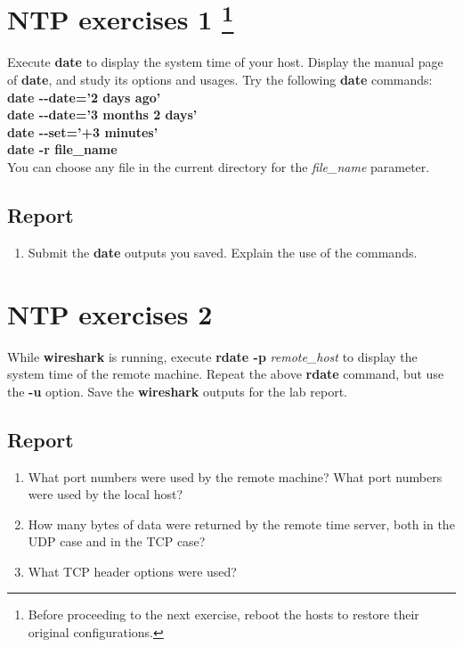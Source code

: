 \documentclass[10pt,a4paper]{article}
\numberwithin{equation}{section}
\numberwithin{figure}{section}
\numberwithin{table}{section}
\begin{document}
    \section*{NTP exercises 1 \footnote{Before proceeding to the next exercise, reboot the hosts to restore their original configurations.}}
    Execute \textbf{date} to display the system time of your host. Display the manual page of \textbf{date}, and study its options and usages.
    Try the following \textbf{date} commands: \\
    \textbf{date -{}-date='2 days ago'} \\
    \textbf{date -{}-date='3 months 2 days'} \\
    \textbf{date -{}-set='+3 minutes'} \\
    \textbf{date -r file\_name}\\
    You can choose any file in the current directory for the \textit{file\_name} parameter.
    \subsection*{Report}
    \begin{enumerate}
        \item Submit the \textbf{date} outputs you saved.
        Explain the use of the commands.
    \end{enumerate}

    \section*{NTP exercises 2}
    While \textbf{wireshark} is running, execute \textbf{rdate -p} \textit{remote\_host} to display the system time of the remote machine.
    Repeat the above \textbf{rdate} command, but use the \textbf{-u} option.
    Save the \textbf{wireshark} outputs for the lab report.

    \subsection*{Report}
    \begin{enumerate}
        \item What port numbers were used by the remote machine?
        What port numbers were used by the local host?
        \item How many bytes of data were returned by the remote time server, both in the UDP case and in the TCP case?
        \item What TCP header options were used?
    \end{enumerate}
\end{document}
